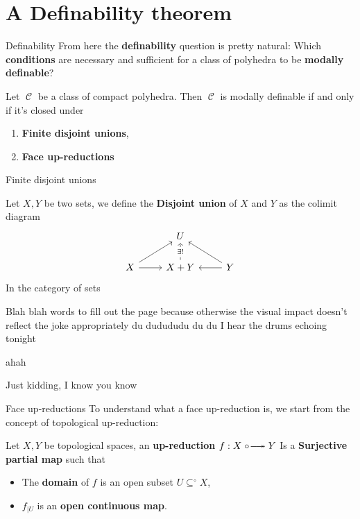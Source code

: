 \documentclass{beamer}
\DeclareMathOperator{\Cc}{\mathcal{C}}
\newcommand{\upred}{
  \mathrel{\circ}~\kern-0.6em~\relbar\joinrel\twoheadrightarrow
}
\begin{document}
\section{A Definability theorem}
\begin{frame}{Definability}
    From here the \textbf{definability} question is pretty natural:
    Which \textbf{conditions} are necessary and sufficient for a class of polyhedra to be 
    \textbf{modally definable}?
    \begin{theorem}[GTKP]
        Let $\Cc$ be a class of compact polyhedra. Then $\Cc$ is modally definable
        if and only if it's closed under 
        \begin{enumerate}[\textbf{(1)}]
            \item \textbf{Finite disjoint unions},
            \item \textbf{Face up-reductions}
        \end{enumerate}
    \end{theorem}
\end{frame}
\begin{frame}{Finite disjoint unions}
    \begin{definition}
        Let $X, Y$ be two sets, we define the 
        \textbf{Disjoint union} of $X$ and $Y$ as the colimit diagram 
        \[\begin{tikzcd}[ampersand replacement=\&]
	\& U \& \\
	X \& {X+Y} \& Y
	\arrow[from=2-1, to=1-2]
	\arrow[from=2-1, to=2-2]
	\arrow["{\exists!}"{description}, dashed, from=2-2, to=1-2]
	\arrow[from=2-3, to=1-2]
	\arrow[from=2-3, to=2-2]
\end{tikzcd}\]
        In the category of sets
    \end{definition}
    Blah blah words to fill out the page 
    because otherwise the visual impact doesn't reflect the
    joke appropriately du dudududu du du
    I hear the drums echoing tonight 
\end{frame}
\begin{frame}{ahah}
    \begin{center}
        Just kidding, I know you know
    \end{center}
\end{frame}
\begin{frame}{Face up-reductions}
    To understand what a face up-reduction is, we start from the concept 
    of topological up-reduction:

    \begin{definition}[Up-reduction]
        Let $X,Y$ be topological spaces, an \textbf{up-reduction} $f:X\upred Y$
        Is a \textbf{Surjective partial map} such that 
        \begin{itemize}
            \item The \textbf{domain} of $f$ is an open subset $U\subseteq^\circ X$,
            \item $f_{|U}$ is an \textbf{open continuous map}.
        \end{itemize}
    \end{definition}
\end{frame}
\end{document}

